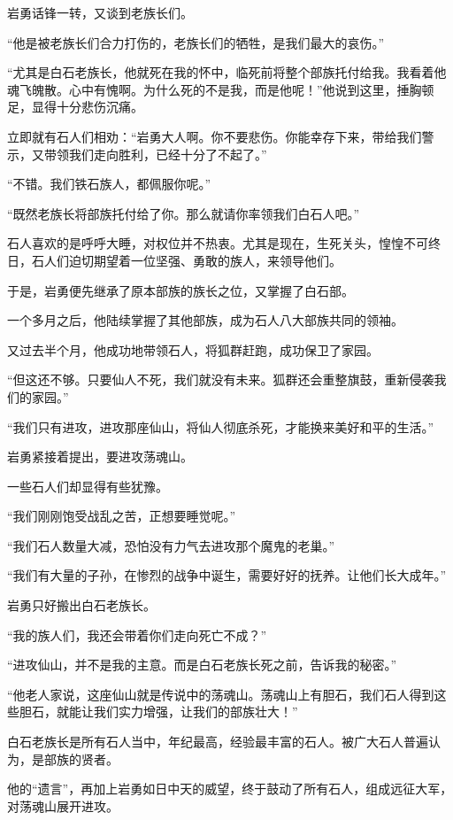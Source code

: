 \begin{this_body}
岩勇话锋一转，又谈到老族长们。

“他是被老族长们合力打伤的，老族长们的牺牲，是我们最大的哀伤。”

“尤其是白石老族长，他就死在我的怀中，临死前将整个部族托付给我。我看着他魂飞魄散。心中有愧啊。为什么死的不是我，而是他呢！”他说到这里，捶胸顿足，显得十分悲伤沉痛。

立即就有石人们相劝：“岩勇大人啊。你不要悲伤。你能幸存下来，带给我们警示，又带领我们走向胜利，已经十分了不起了。”

“不错。我们铁石族人，都佩服你呢。”

“既然老族长将部族托付给了你。那么就请你率领我们白石人吧。”

石人喜欢的是呼呼大睡，对权位并不热衷。尤其是现在，生死关头，惶惶不可终日，石人们迫切期望着一位坚强、勇敢的族人，来领导他们。

于是，岩勇便先继承了原本部族的族长之位，又掌握了白石部。

一个多月之后，他陆续掌握了其他部族，成为石人八大部族共同的领袖。

又过去半个月，他成功地带领石人，将狐群赶跑，成功保卫了家园。

“但这还不够。只要仙人不死，我们就没有未来。狐群还会重整旗鼓，重新侵袭我们的家园。”

“我们只有进攻，进攻那座仙山，将仙人彻底杀死，才能换来美好和平的生活。”

岩勇紧接着提出，要进攻荡魂山。

一些石人们却显得有些犹豫。

“我们刚刚饱受战乱之苦，正想要睡觉呢。”

“我们石人数量大减，恐怕没有力气去进攻那个魔鬼的老巢。”

“我们有大量的子孙，在惨烈的战争中诞生，需要好好的抚养。让他们长大成年。”

岩勇只好搬出白石老族长。

“我的族人们，我还会带着你们走向死亡不成？”

“进攻仙山，并不是我的主意。而是白石老族长死之前，告诉我的秘密。”

“他老人家说，这座仙山就是传说中的荡魂山。荡魂山上有胆石，我们石人得到这些胆石，就能让我们实力增强，让我们的部族壮大！”

白石老族长是所有石人当中，年纪最高，经验最丰富的石人。被广大石人普遍认为，是部族的贤者。

他的“遗言”，再加上岩勇如日中天的威望，终于鼓动了所有石人，组成远征大军，对荡魂山展开进攻。


\end{this_body}
